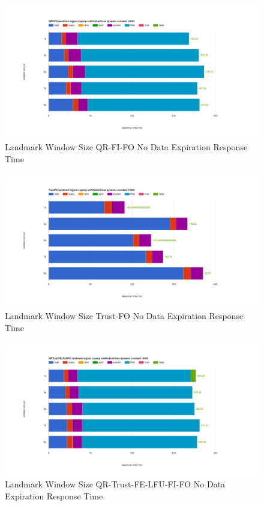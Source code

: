 \begin{figure}[!htbp]
    \centering
    \includegraphics[width=\textwidth]{img/app3-land-ws-qrfifo-no-r.png}
    \caption{Landmark Window Size QR-FI-FO No Data Expiration Response Time}
\end{figure}
\begin{figure}[!htbp]
    \centering
    \includegraphics[width=\textwidth]{img/app3-land-ws-trustfo-no-r.png}
    \caption{Landmark Window Size Trust-FO No Data Expiration Response Time}
\end{figure}
\begin{figure}[!htbp]
    \centering
    \includegraphics[width=\textwidth]{img/app3-land-ws-qrtrustfelfufifo-no-r.png}
    \caption{Landmark Window Size QR-Trust-FE-LFU-FI-FO No Data Expiration Response Time}
\end{figure}

